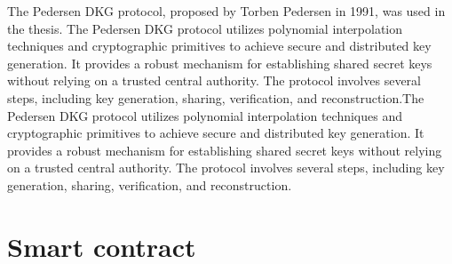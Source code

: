 \documentclass[../Main.tex]{subfiles}
\begin{document}
\indent The Pedersen DKG protocol, proposed by Torben Pedersen \cite{pedersen1991threshold} in 1991, was used in the thesis. The Pedersen DKG protocol utilizes polynomial interpolation techniques and cryptographic primitives to achieve secure and distributed key generation. It provides a robust mechanism for establishing shared secret keys without relying on a trusted central authority. The protocol involves several steps, including key generation, sharing, verification, and reconstruction.The Pedersen DKG protocol utilizes polynomial interpolation techniques and cryptographic primitives to achieve secure and distributed key generation. It provides a robust mechanism for establishing shared secret keys without relying on a trusted central authority. The protocol involves several steps, including key generation, sharing, verification, and reconstruction.
\section{Smart contract}

\end{document}
